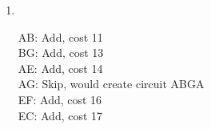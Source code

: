 \begin{enumerate}[label={}, leftmargin=3.5em, labelwidth=3em, align=left]
%
%

\item[Exercise~\ref{ex:kruskal_exercise}] \hspace{.2in}\\
\begin{minipage}{0.5\textwidth}
AB: Add, cost 11\\
BG: Add, cost 13\\
AE: Add, cost 14\\
AG: Skip, would create circuit ABGA\\
EF: Add, cost 16\\
EC: Add, cost 17\\


\end{minipage}
\end{enumerate}

